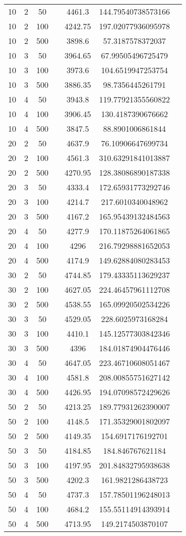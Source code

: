 {\begin{longtabu}{S
S
S
S
S
S[round-mode=places,round-precision=0]
S[round-mode=places,round-precision=0]}
10 & 2 & 50 & & 4461.3 & 144.79540738573166 \\
10 & 2 & 100 & & 4242.75 & 197.02077936095978 \\
10 & 2 & 500 & & 3898.6 & 57.3187578372037 \\
10 & 3 & 50 & & 3964.65 & 67.99505496725479 \\
10 & 3 & 100 & & 3973.6 & 104.6519947253754 \\
10 & 3 & 500 & & 3886.35 & 98.7356445261791 \\
10 & 4 & 50 & & 3943.8 & 119.77921355560822 \\
10 & 4 & 100 & & 3906.45 & 130.4187390676662 \\
10 & 4 & 500 & & 3847.5 & 88.8901006861844 \\
20 & 2 & 50 & & 4637.9 & 76.10906647699734 \\
20 & 2 & 100 & & 4561.3 & 310.63291841013887 \\
20 & 2 & 500 & & 4270.95 & 128.38086890187338 \\
20 & 3 & 50 & & 4333.4 & 172.65931773292746 \\
20 & 3 & 100 & & 4214.7 & 217.6010340048962 \\
20 & 3 & 500 & & 4167.2 & 165.95439132484563 \\
20 & 4 & 50 & & 4277.9 & 170.11875264061865 \\
20 & 4 & 100 & & 4296 & 216.79298881652053 \\
20 & 4 & 500 & & 4174.9 & 149.62884080283453 \\
30 & 2 & 50 & & 4744.85 & 179.43335113629237 \\
30 & 2 & 100 & & 4627.05 & 224.46457961112708 \\
30 & 2 & 500 & & 4538.55 & 165.09920502534226 \\
30 & 3 & 50 & & 4529.05 & 228.6025973168284 \\
30 & 3 & 100 & & 4410.1 & 145.12577303842346 \\
30 & 3 & 500 & & 4396 & 184.01874904476446 \\
30 & 4 & 50 & & 4647.05 & 223.46710608051467 \\
30 & 4 & 100 & & 4581.8 & 208.00855751627142 \\
30 & 4 & 500 & & 4426.95 & 194.07098572429626 \\
50 & 2 & 50 & & 4213.25 & 189.77931262390007 \\
50 & 2 & 100 & & 4148.5 & 171.35329001802097 \\
50 & 2 & 500 & & 4149.35 & 154.6917176192701 \\
50 & 3 & 50 & & 4184.85 & 184.846767621184 \\
50 & 3 & 100 & & 4197.95 & 201.84832795938638 \\
50 & 3 & 500 & & 4202.3 & 161.9821286438723 \\
50 & 4 & 50 & & 4737.3 & 157.78501196248013 \\
50 & 4 & 100 & & 4684.2 & 155.55114914393914 \\
50 & 4 & 500 & & 4713.95 & 149.2174503870107 \\
\hline
\end{longtabu}

}

